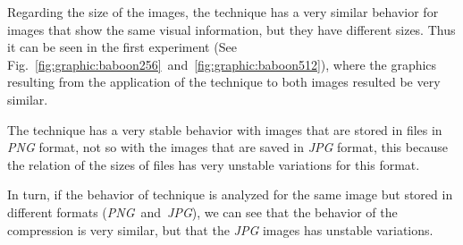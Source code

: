 \documentclass[journal]{IEEEtran}
\begin{document}
Regarding the size of the images, the technique has a very similar behavior for images that show the same visual information, but they have different sizes. Thus it can be seen in the first experiment (See Fig.~\ref{fig:graphic:baboon256}~and~\ref{fig:graphic:baboon512}), where the graphics resulting from the application of the technique to both images resulted be very similar.


The technique has a very stable behavior with images that are stored in files in  \textit{PNG} format, not so with the images that are saved in \textit{JPG} format, this because the relation of the sizes of files has very unstable variations for this format.


In turn, if the behavior of technique is analyzed for the same image but stored in different formats (\textit{PNG}~and~\textit{JPG}), we can see that the behavior of the compression is very similar, but that the \textit{JPG} images has unstable variations.
\end{document}
